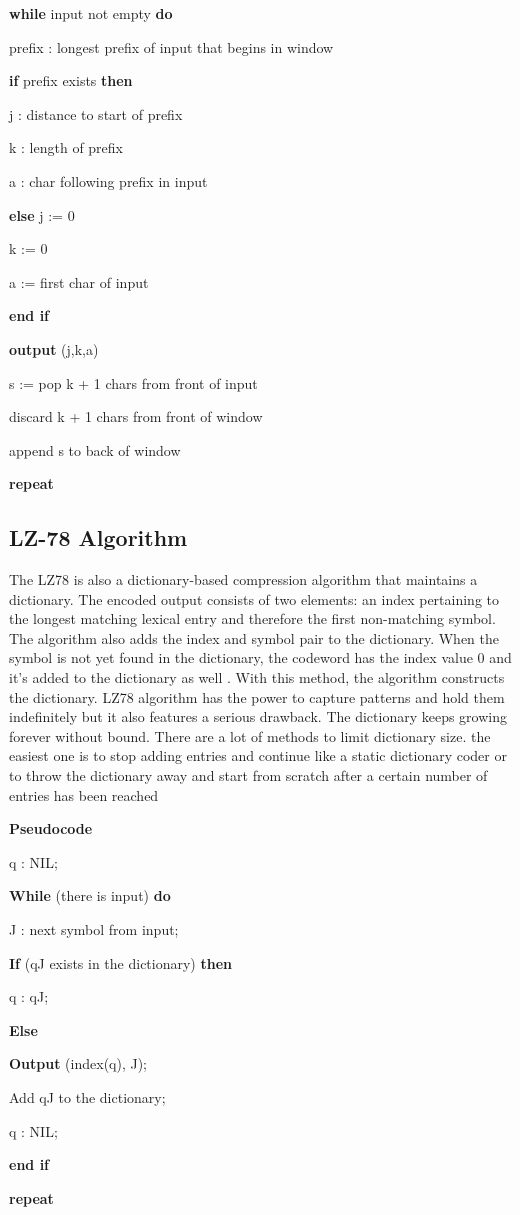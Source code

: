 \documentclass{article}
\begin{document}
\textbf{while} input not empty \textbf{do}

prefix : longest prefix of input that begins in window

\textbf{if} prefix exists \textbf{then}

j : distance to start of prefix

k : length of prefix

a : char following prefix in input

\textbf{else
}
j := 0

k := 0

a := first char of input

\textbf{end if}

\textbf{output} (j,k,a)

s := pop k + 1 chars from front of input

discard k + 1 chars from front of window

append s to back of window

\textbf{repeat}
\subsection{LZ-78 Algorithm}
The LZ78 is also a dictionary-based compression algorithm that maintains a dictionary. The encoded output
consists of two elements: an index pertaining to the longest matching lexical entry and therefore the first non-matching
symbol. The algorithm also adds the index and symbol pair to the dictionary. When the symbol is not yet found in
the dictionary, the codeword has the index value 0 and it's added to the dictionary as well . With this method, the
algorithm constructs the dictionary.
LZ78 algorithm has the power to capture patterns and hold them indefinitely but it also features a serious drawback.
The dictionary keeps growing forever without bound. There are a lot of methods to limit dictionary size. the
easiest one is to stop adding entries and continue like a static dictionary coder or to throw the dictionary away and
start from scratch after a certain number of entries has been reached\cite{zeeh2003lempel}

\textbf{Pseudocode}

q : NIL;

\textbf{While} (there is input) \textbf{do}{
	
	
	J : next symbol from input;
	
	\textbf{If} (qJ exists in the dictionary) \textbf{then} {
		
		q : qJ;
		
	}
	
	\textbf{Else} {
		
		\textbf{Output} (index(q), J);
		
		Add qJ to the dictionary;
		
		q : NIL;
		
	}\textbf{end if}
	
}\textbf{repeat}
\end{document}
